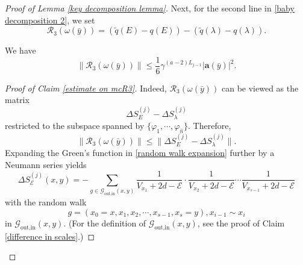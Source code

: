 \documentclass[10pt,a4paper]{amsart}
\newcommand{\bfa}{\mathbf{a}}
\newcommand{\diffSj}{\Delta {S}^{(j)}}
\newcommand{\mcE}{\mathcal{E}}
\newcommand{\mcG}{\mathcal{G}}
\newcommand{\mcR}{\mathcal{R}}
\newcommand{\tq}{\tilde{q}}
\newcommand{\whn}{\widehat{n}}
\begin{document}
\begin{proof}[Proof of Lemma \ref{key decomposition lemma}]
Next, for the second line in \eqref{baby decomposition 2}, we set 
\begin{equation}\label{mcR3}
  \mcR_3(\omega(\bar{y}))= (\tq(E)-q(E))-(\tq(\lambda) -q(\lambda)).
\end{equation}
\begin{claim}\label{estimate on mcR3}
  We have 
  \[\|\mcR_3(\omega(\bar{y})) \| \leq \frac{1}{6}\gamma^{(a-2)L_{j-1}} |\bfa(\bar{y})|^2 .\]
\end{claim}
\begin{proof}[Proof of Claim \ref{estimate on mcR3}]
Indeed, $\mcR_3(\omega(\bar{y}))$ can be viewed  as the matrix 
\[\diffSj_{E}-\diffSj_{\lambda} \]
restricted to the subspace spanned by $\{\varphi_1,\cdots,\varphi_{\whn}\}$. Therefore,
\[\|\mcR_3(\omega(\bar{y})) \|\leq \| \diffSj_{E}-\diffSj_{\lambda}  \| .\]
Expanding the Green's function in \eqref{random walk expansion} further by a Neumann series yields 
\begin{equation}\label{scales not derivation}
  \diffSj_{\mcE}(x,y) =-\sum_{g\in \mcG_{\text{out,in}}(x,y) } \frac{1}{V_{x_1}+2d-\mcE} \cdot \frac{1}{V_{x_2}+2d-\mcE} \cdots \frac{1}{V_{x_{s-1}}+2d-\mcE} 
\end{equation}
with the random walk 
\[g=(x_0=x,x_1,x_2,\cdots,x_{s-1},x_s=y),x_{i-1}\sim x_i\]
in $\mcG_{\text{out,in}}(x,y)$. (For the definition of $\mcG_{\text{out,in}}(x,y)$, see the proof of Claim \ref{difference in scales}.) 


\end{proof}
\end{proof}
\end{document}

